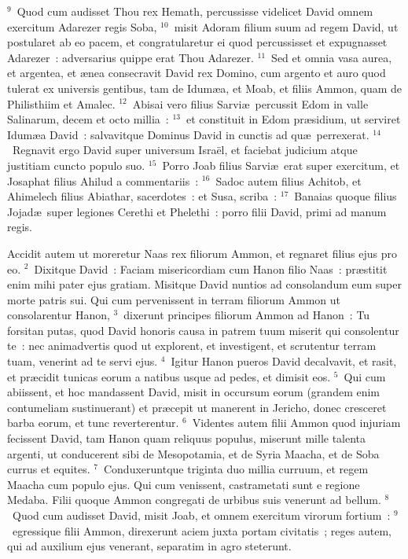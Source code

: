 ${}^{9}$~Quod cum audisset Thou rex Hemath, percussisse videlicet David omnem exercitum Adarezer regis Soba,
${}^{10}$~misit Adoram filium suum ad regem David, ut postularet ab eo pacem, et congratularetur ei quod percussisset et expugnasset Adarezer~: adversarius quippe erat Thou Adarezer.
${}^{11}$~Sed et omnia vasa aurea, et argentea, et \ae nea consecravit David rex Domino, cum argento et auro quod tulerat ex universis gentibus, tam de Idum\ae a, et Moab, et filiis Ammon, quam de Philisthiim et Amalec.
${}^{12}$~Abisai vero filius Sarvi\ae\ percussit Edom in valle Salinarum, decem et octo millia~:
${}^{13}$~et constituit in Edom pr\ae sidium, ut serviret Idum\ae a David~: salvavitque Dominus David in cunctis ad qu\ae\ perrexerat.
${}^{14}$~Regnavit ergo David super universum Isra\"el, et faciebat judicium atque justitiam cuncto populo suo.
${}^{15}$~Porro Joab filius Sarvi\ae\ erat super exercitum, et Josaphat filius Ahilud a commentariis~:
${}^{16}$~Sadoc autem filius Achitob, et Ahimelech filius Abiathar, sacerdotes~: et Susa, scriba~:
${}^{17}$~Banaias quoque filius Jojad\ae\ super legiones Cerethi et Phelethi~: porro filii David, primi ad manum regis.

\lettrine[lines=3,image=true,loversize=0.05,lraise=-0.03]{A}{}ccidit autem ut moreretur Naas rex filiorum Ammon, et regnaret filius ejus pro eo.
${}^{2}$~Dixitque David~: Faciam misericordiam cum Hanon filio Naas~: pr\ae stitit enim mihi pater ejus gratiam. Misitque David nuntios ad consolandum eum super morte patris sui. Qui cum pervenissent in terram filiorum Ammon ut consolarentur Hanon,
${}^{3}$~dixerunt principes filiorum Ammon ad Hanon~: Tu forsitan putas, quod David honoris causa in patrem tuum miserit qui consolentur te~: nec animadvertis quod ut explorent, et investigent, et scrutentur terram tuam, venerint ad te servi ejus.
${}^{4}$~Igitur Hanon pueros David decalvavit, et rasit, et pr\ae cidit tunicas eorum a natibus usque ad pedes, et dimisit eos.
${}^{5}$~Qui cum abiissent, et hoc mandassent David, misit in occursum eorum (grandem enim contumeliam sustinuerant) et pr\ae cepit ut manerent in Jericho, donec cresceret barba eorum, et tunc reverterentur.
${}^{6}$~Videntes autem filii Ammon quod injuriam fecissent David, tam Hanon quam reliquus populus, miserunt mille talenta argenti, ut conducerent sibi de Mesopotamia, et de Syria Maacha, et de Soba currus et equites.
${}^{7}$~Conduxeruntque triginta duo millia curruum, et regem Maacha cum populo ejus. Qui cum venissent, castrametati sunt e regione Medaba. Filii quoque Ammon congregati de urbibus suis venerunt ad bellum.
${}^{8}$~Quod cum audisset David, misit Joab, et omnem exercitum virorum fortium~:
${}^{9}$~egressique filii Ammon, direxerunt aciem juxta portam civitatis~; reges autem, qui ad auxilium ejus venerant, separatim in agro steterunt.



